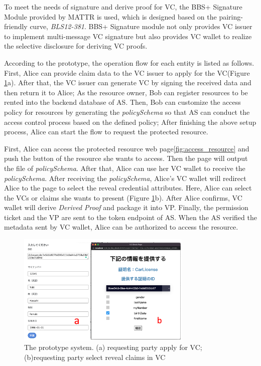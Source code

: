 \documentclass[conference, dvipdfmx]{IEEEtran} %
\begin{document}
\begin{sloppypar}
To meet the needs of signature and derive proof for VC, the BBS+ Signature Module\cite{bbsplus_github} provided by MATTR is used, which is designed based on the pairing-friendly curve, \textit{BLS12-381}.
BBS+ Signature module not only provides VC issuer to implement multi-message VC signature but also provides VC wallet to realize the selective disclosure for deriving VC proofs. 

According to the prototype, the operation flow for each entity is listed as follows. First, Alice can provide claim data to the VC issuer to apply for the VC(Figure \ref{fig:applyvc_selectclaim}a). 
After that, the VC issuer can generate VC by signing the received data and then return it to Alice;
As the resource owner, Bob can register resources to be rented into the backend database of AS. Then, Bob can customize the access policy for resources by generating the \textit{policySchema} so that AS can conduct the access control process based on the defined policy;
After finishing the above setup process, Alice can start the flow to request the protected resource.

First, Alice can access the protected resource web page\ref{fig:access_resource} and push the button of the resource she wants to access. Then the page will output the file of \textit{policySchema}. After that, Alice can use her VC wallet to receive the \textit{policySchema}. 
After receiving the \textit{policySchema}, Alice's VC wallet will redirect Alice to the page to select the reveal credential attributes. 
Here, Alice can select the VCs or claims she wants to present (Figure \ref{fig:applyvc_selectclaim}b). After Alice confirms, VC wallet will derive \textit{Derived Proof} and package it into VP.
Finally, the permission ticket and the VP are sent to the token endpoint of AS. When the AS verified the metadata sent by VC wallet, Alice can be authorized to access the resource.

\begin{figure}[htbp] %
  \begin{center} %
  \includegraphics[width=83mm]{images/applyvc_selectclaim.png} %
  \caption{The prototype system. (a) requesting party apply for VC; (b)requesting party select reveal claims in VC} %
  \label{fig:applyvc_selectclaim} %
  \end{center}
\end{figure}


\end{sloppypar}
\end{document}

